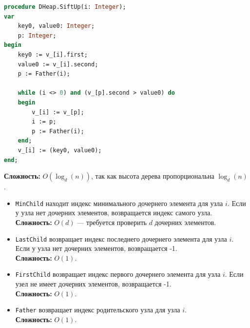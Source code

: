 \begin{lstlisting}[language=Pascal]
procedure DHeap.SiftUp(i: Integer);
var
    key0, value0: Integer;
    p: Integer;
begin
    key0 := v_[i].first;
    value0 := v_[i].second;
    p := Father(i);

    while (i <> 0) and (v_[p].second > value0) do
    begin
        v_[i] := v_[p];
        i := p;
        p := Father(i);
    end;
    v_[i] := (key0, value0);
end;
\end{lstlisting}

\textbf{Сложность:} $O(\log_d(n))$, так как высота дерева пропорциональна $\log_d(n)$.

\begin{itemize}[label=•, labelsep=1em]
    \item \texttt{MinChild} находит индекс минимального дочернего элемента для узла $i$. Если у узла нет дочерних элементов, возвращается индекс самого узла.\\
    \textbf{Сложность:} $O(d)$ — требуется проверить $d$ дочерних элементов.
\end{itemize}

\begin{itemize}[label=•, labelsep=1em]
    \item \texttt{LastChild} возвращает индекс последнего дочернего элемента для узла $i$. Если у узла нет дочерних элементов, возвращается -1.\\
    \textbf{Сложность:} $O(1)$.
\end{itemize}

\begin{itemize}[label=•, labelsep=1em]
    \item \texttt{FirstChild} возвращает индекс первого дочернего элемента для узла $i$. Если узел не имеет дочерних элементов, возвращается -1.\\
    \textbf{Сложность:} $O(1)$.
\end{itemize}

\begin{itemize}[label=•, labelsep=1em]
    \item \texttt{Father} возвращает индекс родительского узла для узла $i$.\\
    \textbf{Сложность:} $O(1)$.
\end{itemize}